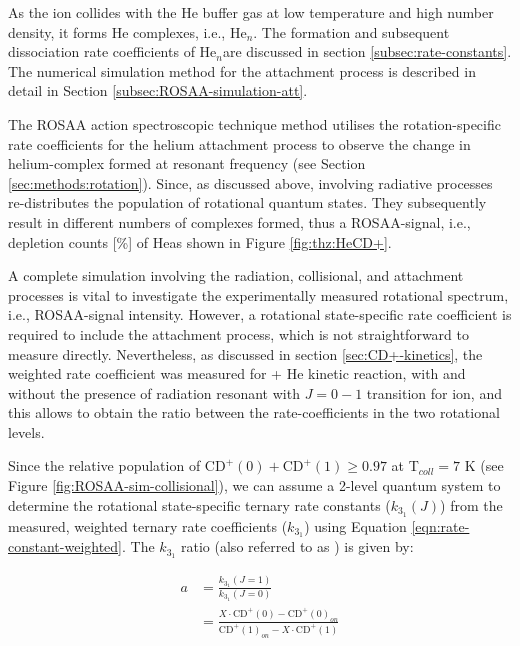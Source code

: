 As the \CD ion collides with the He buffer gas at low temperature and high
number density, it forms He complexes, i.e., He$_n$\CD. The formation and
subsequent dissociation rate coefficients of He$_n$\CD are discussed in section
\ref{subsec:rate-constants}. The numerical simulation method for the attachment
process is described in detail in Section \ref{subsec:ROSAA-simulation-att}.

The ROSAA action spectroscopic technique method utilises the rotation-specific
rate coefficients for the helium attachment process to observe the change in
helium-complex formed at resonant frequency (see Section
\ref{sec:methods:rotation}). Since, as discussed above, involving radiative
processes re-distributes the population of rotational quantum states. They
subsequently result in different numbers of complexes formed, thus a
ROSAA-signal, i.e., depletion counts [\%] of He\CD as shown in Figure
\ref{fig:thz:HeCD+}.

A complete simulation involving the radiation, collisional, and attachment
processes is vital to investigate the experimentally measured rotational
spectrum, i.e., ROSAA-signal intensity. However, a rotational state-specific
rate coefficient is required to include the attachment process, which is not
straightforward to measure directly. Nevertheless, as discussed in section
\ref{sec:CD+-kinetics}, the weighted rate coefficient was measured for \CD + He
kinetic reaction, with and without the presence of radiation resonant with
$J=0-1$ transition for \CD ion, and this allows to obtain the ratio between the
rate-coefficients in the two rotational levels.

Since the relative population of ${\text{CD}^+}(0) + \text{CD}^+(1) \geq 0.97 $
at T$_{coll}=7$ K (see Figure \ref{fig:ROSAA-sim-collisional}), we can assume a
2-level quantum system to determine the rotational state-specific ternary rate
constants ($k_{3_1}(J)$) from the measured, weighted ternary rate coefficients
($k_{3_1}$) using Equation \ref{eqn:rate-constant-weighted}. The $k_{3_1}$
ratio (also referred to as ) is given by:

\begin{equation}
    \begin{split}
        a & = \frac{k_{3_1}(J=1)}{k_{3_1}(J=0)}\\
        & = \frac{X \cdot \text{CD}^+(0) - \text{CD}^+(0)_{on}}{\text{CD}^+(1)_{on} - X\cdot \text{CD}^+(1)}
    \end{split}
    \label{eqns:rate-constant-change-ratio}
\end{equation}


